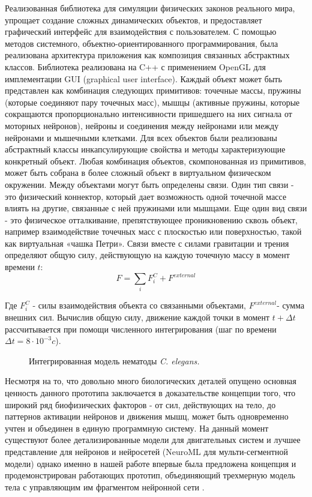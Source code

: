 Реализованная библиотека для симуляции физических законов реального мира, упрощает создание сложных динамических объектов, и предоставляет графический интерфейс для взаимодействия с пользователем. С помощью методов системного, объектно-ориенти­рованного программирования, была реализована архитектура приложения как композиция связанных абстрактных классов. Библиотека реализована на C++ с применением OpenGL для имплементации GUI (graphical user interface). Каждый объект может быть представлен как комбинация следующих примитивов: точечные массы, пружины (которые соединяют пару точечных масс), мышцы (активные пружины, которые сокращаются пропорционально интенсивности пришедшего на них сигнала от моторных нейронов), нейроны и соединения между нейронами или между нейронами и мышечными клетками. Для всех объектов были реализованы абстрактный классы инкапсулирующие свойства и методы характеризующие конкретный объект. Любая комбинация объектов, скомпонованная из примитивов, может быть собрана в более сложный объект в виртуальном физическом окружении. Между объектами могут быть определены связи. Один тип связи - это физический коннектор, который дает возможность одной точечной массе влиять на другие, связанные с ней пружинами или мышцами. Еще один вид связи - это физическое отталкивание, препятствующее проникновению сквозь объект, например взаимодействие точечных масс с плоскостью или поверхностью, такой как виртуальная «чашка Петри». Связи вместе с силами гравитации и трения определяют общую силу, действующую на каждую точечную массу в момент времени \( t \):
\[
    F=\sum_{i} F_{i}^C + F^{external}
\]

Где \( F_{i}^C \) - силы взаимодействия объекта со связанными объектами, \( F^{external}  \)- сумма внешних сил. Вычислив общую силу, движение каждой точки в момент \( t + \Delta t \) рассчитывается при помощи численного интегрирования (шаг по времени \( \Delta t = 8 \cdot 10^{-3}c \)).

\begin{figure}[ht]
    \caption{Интегрированная модель нематоды \textit{C. elegans.}}\label{fig:cyber_elegans}
\end{figure}

Несмотря на то, что довольно много биологических деталей опущено основная ценность данного прототипа заключается в доказательстве концепции того, что широкий ряд биофизических факторов - от сил, действующих на тело, до паттернов активации нейронов и движения мышц, может быть одновременно учтен и объединен в единую программную систему. На данный момент существуют более детализированные модели для двигательных систем \cite{Boyle2012} и лучшее представление для нейронов и нейросетей (NeuroML \cite {Gleeson2010} для мульти-сегментной модели) однако именно в нашей работе впервые была предложена концепция и продемонстрирован работающих прототип, объединяющий трехмерную модель тела с управляющим им фрагментом нейронной сети \cite {Palyanov2012}.

